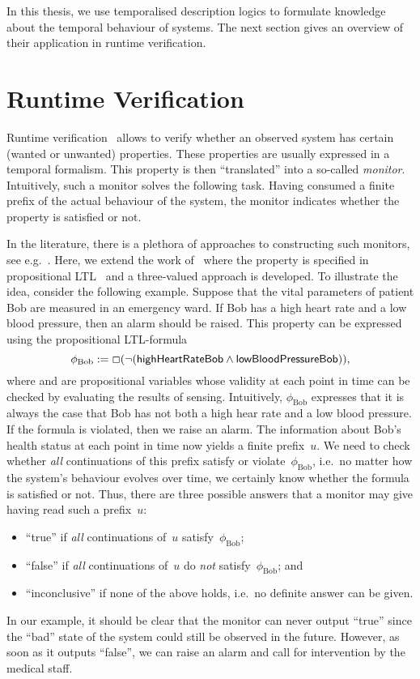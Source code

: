 In this thesis, we use temporalised description logics to formulate knowledge
about the temporal behaviour of systems.  The next section gives an overview of
their application in runtime verification.


\section{Runtime Verification}\label{sec:intro-monitor}

Runtime verification~\cite{CoMa-MBTRS04} allows to verify whether an observed
system has certain (wanted or unwanted) properties.  These properties are
usually expressed in a temporal formalism.  This property is then
\enquote{translated} into a so-called \emph{monitor}.  Intuitively, such a
monitor solves the following task.  Having consumed a finite prefix of the
actual behaviour of the system, the monitor indicates whether the property is
satisfied or not.

In the literature, there is a plethora of approaches to constructing such
monitors, see
e.g.~\cite{HaRo-STTT04,RoHa-ASE05,Ros-SACS12,dARo-CAV05,BaLS-JLC10,BaLS-ToSEM11,BGH+-IPDPS04,BaRH-RV07,BaBL-FroCoS09}.
%
Here, we extend the work of~\cite{BaLS-ToSEM11} where the property is specified
in propositional LTL~\cite{Pnu-FOCS77} and a three-valued approach is developed.
To illustrate the idea, consider the following example.  Suppose that the vital
parameters of patient Bob are measured in an emergency ward.  If Bob has a high
heart rate and a low blood pressure, then an alarm should be raised.  This
property can be expressed using the propositional LTL-formula
\[\phi_\text{Bob}:=\Box(\lnot(\mathsf{highHeartRateBob}\land\mathsf{lowBloodPressureBob})),\]
where \highHeartRateBob and \lowBloodPressureBob are propositional variables
whose validity at each point in time can be checked by evaluating the results of
sensing.  Intuitively, $\phi_\text{Bob}$ expresses that it is always the case
that Bob has not both a high hear rate and a low blood pressure.  If the formula
is violated, then we raise an alarm.  The information about Bob's health status
at each point in time now yields a finite prefix~$u$.  We need to check whether
\emph{all} continuations of this prefix satisfy or violate~$\phi_\text{Bob}$,
i.e.~no matter how the system's behaviour evolves over time, we certainly know
whether the formula is satisfied or not.  Thus, there are three possible answers
that a monitor may give having read such a prefix~$u$:
\begin{itemize}
    \item \enquote{true} if \emph{all} continuations of~$u$
        satisfy~$\phi_\text{Bob}$;
    \item \enquote{false} if \emph{all} continuations of~$u$
        do \emph{not} satisfy~$\phi_\text{Bob}$; and
    \item \enquote{inconclusive} if none of the above holds, i.e.~no definite
        answer can be given.
\end{itemize}
%
In our example, it should be clear that the monitor can never output
\enquote{true} since the \enquote{bad} state of the system could still be
observed in the future.  However, as soon as it outputs \enquote{false}, we can
raise an alarm and call for intervention by the medical staff.

